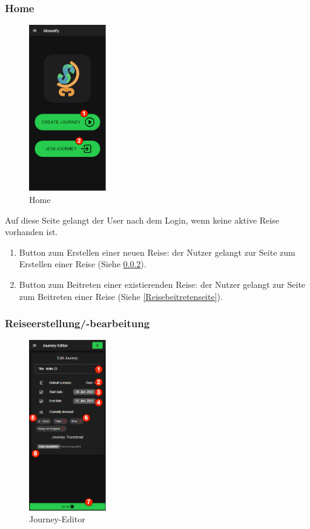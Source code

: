 \subsubsection{Home}\label{Home}
\begin{figure}[H]
	\centering
	\includegraphics[width=0.3\textwidth]{img/pages_numbers/home.drawio}
	\caption[Home]{Home}
	\label{fig:Home}
\end{figure}

Auf diese Seite gelangt der User nach dem Login, wenn keine aktive Reise vorhanden ist.

\begin{enumerate}[label=\protect\circled{\arabic*}]
	\item Button zum Erstellen einer neuen Reise: der Nutzer gelangt zur Seite zum Erstellen einer Reise (Siehe \ref{Journey-Editor}).
	\item Button zum Beitreten einer existierenden Reise: der Nutzer gelangt zur Seite zum Beitreten einer Reise (Siehe \ref{Reisebeitretenseite}).
\end{enumerate}

\subsubsection{Reiseerstellung/-bearbeitung}\label{Journey-Editor}
\begin{figure}[H]
	\centering
	\includegraphics[width=0.3\textwidth]{img/pages_numbers/journey-editor.drawio}
	\caption[Journey-Editor]{Journey-Editor}
	\label{fig:Journey-Editor}
\end{figure}

